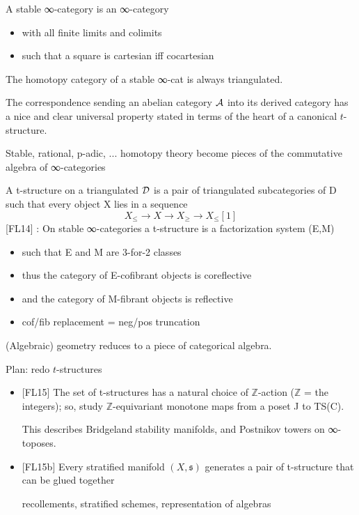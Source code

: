 \documentclass{beamer}
\begin{document}
%
%
%
%
%
\begin{frame}
  A stable ∞-category is an ∞-category
\begin{itemize}
\item with all finite limits and colimits
\item such that a square is cartesian iff cocartesian
\end{itemize}
\onslide<+->
The homotopy category of a stable ∞-cat is always triangulated.

\onslide<+->
The correspondence sending an abelian category $\cal A$ into its derived category has a nice and clear universal property stated in terms of the heart of a canonical $t$-structure.

\onslide<+->
Stable, rational, p-adic, ...  homotopy theory become pieces of the commutative algebra of  ∞-categories
\end{frame}
%
%
%
%
%
\begin{frame}
  A t-structure on a triangulated $\cal D$ is a pair of triangulated subcategories of D such that every object X lies in a sequence
\[X_{\le} \to X \to X_\ge \to X_\le[1]\]
[\alert{FL14}] : On stable ∞-categories a t-structure is a factorization system (E,M)
\begin{itemize}
\item<+-> such that E and M are 3-for-2 classes
\item<+-> thus the category of E-cofibrant objects is coreflective
\item<+-> and the category of M-fibrant objects is reflective
\item<+-> cof/fib replacement = neg/pos truncation
\end{itemize}
(Algebraic) geometry reduces to a piece of categorical algebra.
\end{frame}
%
%
%
\begin{frame}{Plan: redo $t$-structures}
  \begin{itemize}
\item<+-> {} [\alert{FL15}] The set of t-structures has a natural choice of $\mathbb Z$-action ($\mathbb Z$ = the integers); so, study $\mathbb Z$-equivariant monotone maps from a poset J to TS(C).

{\footnotesize This describes Bridgeland stability manifolds, and Postnikov towers on ∞-toposes.}

\item<+-> {} [\alert{FL15b}] Every stratified manifold $(X,\mathfrak s)$ generates a pair of t-structure that can be glued together

{\footnotesize recollements, stratified schemes, representation of algebras}

  \end{itemize}
\end{frame}
\end{document}
